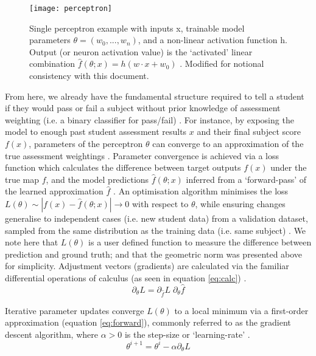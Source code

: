 \begin{figure}[H]
	\begin{center}
		\texttt{[image: perceptron]}
		\caption{Single perceptron example with inputs x, trainable model parameters $\theta = (w_{0}, ...,w_{n} )$, and a non-linear activation function h. Output (or neuron activation value) is the `activated' linear combination $\hat{f}(\theta; x) = h(w \cdot x + w_{0})$ \cite{cintra2018}. Modified for notional consistency with this document.}
		\label{fig:percept}
	\end{center}
\end{figure}

From here, we already have the fundamental structure required to tell a student if they would pass or fail a subject without prior knowledge of assessment weighting (i.e. a binary classifier for pass/fail) \cite{rosenblatt1957}. For instance, by exposing the model to enough past student assessment results $x$ and their final subject score $f(x)$, parameters of the perceptron $\theta$ can converge to an approximation of the true assessment weightings \cite{Lundervold2019}. Parameter convergence is achieved via a loss function which calculates the difference between target outputs $f(x)$ under the true map $f$, and the model predictions $\hat{f}(\theta; x)$ inferred from a `forward-pass' of the learned approximation $\hat{f}$ \cite{Bertels2019}. An optimisation algorithm minimises the loss $L(\theta) \sim |f(x)-\hat{f}(\theta; x)| \to 0$ with respect to $\theta$, while ensuring changes generalise to independent cases (i.e. new student data) from a validation dataset, sampled from the same distribution as the training data (i.e. same subject) \cite{Maier2019}. We note here that $L(\theta)$ is a user defined function to measure the difference between prediction and ground truth; and that the geometric norm was presented above for simplicity. Adjustment vectors (gradients) are calculated via the familiar differential operations of calculus (as seen in equation \ref{eq:calc}) \cite{Maier2019}.
\begin{equation}
\partial_{\theta} L = \partial_{\hat{f}}  L \; \partial_{\theta} \hat{f}
\label{eq:calc}
\end{equation}

Iterative parameter updates converge $L(\theta)$ to a local minimum via a first-order approximation (equation \ref{eq:forward}), commonly referred to as the gradient descent algorithm, where $\alpha>0$ is the step-size or `learning-rate' \cite{Maier2019}.
\begin{equation}
\theta^{i+1} = \theta^{i} - \alpha \partial_{\theta} L 
\label{eq:forward}
\end{equation}

